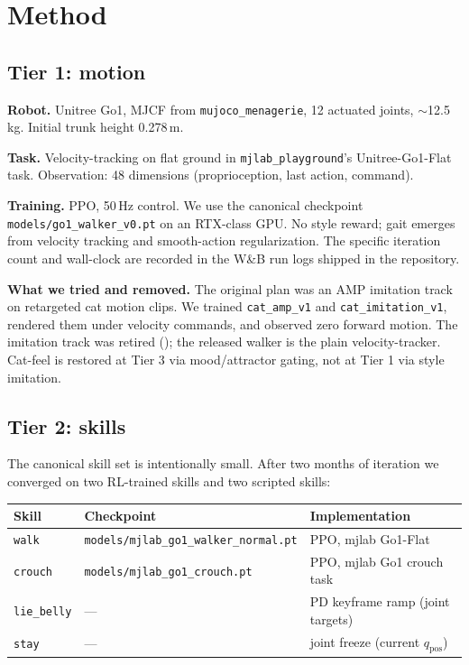 \documentclass[11pt]{article}
\begin{document}
\section{Method}
\label{sec:method}

\subsection{Tier 1: motion}

\textbf{Robot.} Unitree Go1, MJCF from \texttt{mujoco\_menagerie}, 12 actuated
joints, $\sim$12.5\,kg. Initial trunk height 0.278\,m.

\textbf{Task.} Velocity-tracking on flat ground in
\texttt{mjlab\_playground}'s Unitree-Go1-Flat task. Observation: 48
dimensions (proprioception, last action, command).

\textbf{Training.} PPO, 50\,Hz control. We use the canonical checkpoint
\texttt{models/go1\_walker\_v0.pt} on an RTX-class GPU. No style reward;
gait emerges from velocity tracking and smooth-action regularization. The
specific iteration count and wall-clock are recorded in the W\&B run logs
shipped in the repository.

\textbf{What we tried and removed.}
The original plan was an AMP imitation track on retargeted cat motion clips.
We trained \texttt{cat\_amp\_v1} and \texttt{cat\_imitation\_v1}, rendered
them under velocity commands, and observed zero forward motion. The
imitation track was retired (); the released walker is the
plain velocity-tracker. Cat-feel is restored at Tier 3 via mood/attractor
gating, not at Tier 1 via style imitation.

\subsection{Tier 2: skills}
\label{subsec:skills}

The canonical skill set is intentionally small. After two months of
iteration we converged on two RL-trained skills and two scripted skills:

\begin{center}\small
\begin{tabular}{lll}
\toprule
Skill & Checkpoint & Implementation \\
\midrule
\texttt{walk}      & \texttt{models/mjlab\_go1\_walker\_normal.pt} & PPO, mjlab Go1-Flat \\
\texttt{crouch}    & \texttt{models/mjlab\_go1\_crouch.pt}        & PPO, mjlab Go1 crouch task \\
\texttt{lie\_belly} & ---                                          & PD keyframe ramp (joint targets) \\
\texttt{stay}      & ---                                          & joint freeze (current $q_\text{pos}$) \\
\bottomrule
\end{tabular}
\end{center}
\end{document}
